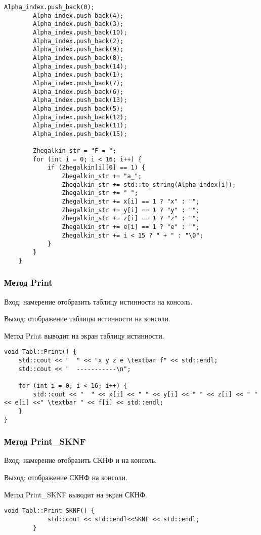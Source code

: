 \documentclass[10pt,a4paper,final]{article} %
\begin{document}
\begin{lstlisting}[caption={Конструктор Tabl}]
		Alpha_index.push_back(0);
		Alpha_index.push_back(4);
		Alpha_index.push_back(3);
		Alpha_index.push_back(10);
		Alpha_index.push_back(2);
		Alpha_index.push_back(9);
		Alpha_index.push_back(8);
		Alpha_index.push_back(14);
		Alpha_index.push_back(1);
		Alpha_index.push_back(7);
		Alpha_index.push_back(6);
		Alpha_index.push_back(13);
		Alpha_index.push_back(5);
		Alpha_index.push_back(12);
		Alpha_index.push_back(11);
		Alpha_index.push_back(15);
		
		Zhegalkin_str = "F = ";
		for (int i = 0; i < 16; i++) {
			if (Zhegalkin[i][0] == 1) {
				Zhegalkin_str += "a_";
				Zhegalkin_str += std::to_string(Alpha_index[i]);
				Zhegalkin_str += " ";
				Zhegalkin_str += x[i] == 1 ? "x" : "";
				Zhegalkin_str += y[i] == 1 ? "y" : "";
				Zhegalkin_str += z[i] == 1 ? "z" : "";
				Zhegalkin_str += e[i] == 1 ? "e" : "";
				Zhegalkin_str += i < 15 ? " + " : "\0";
			}
		}
	}
\end{lstlisting}
\subsubsection{Метод Print}
\par Вход: намерение отобразить  таблицу истинности на консоль. 
\par Выход: отображение таблицы истинности на консоли.
\par Метод Print выводит на экран таблицу истинности.

\begin{lstlisting}[caption={Метод Print}]
void Tabl::Print() {
	std::cout << "  " << "x y z e \textbar f" << std::endl;
	std::cout << "  -----------\n";

	for (int i = 0; i < 16; i++) {
		std::cout << "  " << x[i] << " " << y[i] << " " << z[i] << " " << e[i] <<" \textbar " << f[i] << std::endl;
	}
}
\end{lstlisting}


\subsubsection{Метод Print\_SKNF}
\par Вход: намерение отобразить  СКНФ и на консоль. 
\par Выход: отображение СКНФ на консоли.
\par Метод Print\_SKNF выводит на экран СКНФ.
\begin{lstlisting}[caption={Метод Print\_SKNF}]
		void Tabl::Print_SKNF() {
			std::cout << std::endl<<SKNF << std::endl;
		}
\end{lstlisting}
\end{document}
